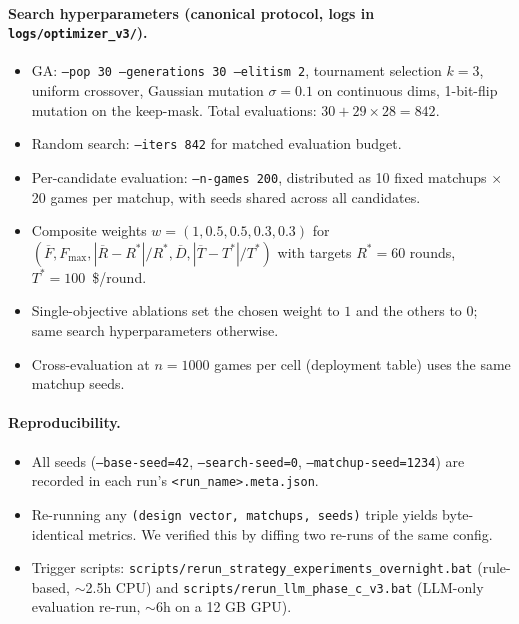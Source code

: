 \documentclass[10pt]{article}
\begin{document}
\paragraph{Search hyperparameters (canonical protocol, logs in
\texttt{logs/optimizer\_v3/}).}
\begin{itemize}[leftmargin=1.2em,itemsep=1pt]
\item GA: \texttt{--pop 30 --generations 30 --elitism 2}, tournament
selection $k{=}3$, uniform crossover, Gaussian mutation
$\sigma{=}0.1$ on continuous dims, 1-bit-flip mutation on the
keep-mask. Total evaluations: $30 + 29 \times 28 = 842$.
\item Random search: \texttt{--iters 842} for matched evaluation
budget.
\item Per-candidate evaluation: \texttt{--n-games 200}, distributed
as 10 fixed matchups $\times$ 20 games per matchup, with seeds
shared across all candidates.
\item Composite weights $w = (1, 0.5, 0.5, 0.3, 0.3)$ for
$(\overline{F}, F_{\max}, |\overline{R}-R^{*}|/R^{*},
\overline{D}, |\overline{T}-T^{*}|/T^{*})$ with targets
$R^{*} = 60$ rounds, $T^{*} = 100$~\$/round.
\item Single-objective ablations set the chosen weight to $1$ and
the others to $0$; same search hyperparameters otherwise.
\item Cross-evaluation at $n{=}1000$ games per cell (deployment
table) uses the same matchup seeds.
\end{itemize}

\paragraph{Reproducibility.}
\begin{itemize}[leftmargin=1.2em,itemsep=1pt]
\item All seeds (\texttt{--base-seed=42}, \texttt{--search-seed=0},
\texttt{--matchup-seed=1234}) are recorded in each run's
\texttt{<run\_name>.meta.json}.
\item Re-running any \texttt{(design vector, matchups, seeds)}
triple yields byte-identical metrics. We verified this by diffing
two re-runs of the same config.
\item Trigger scripts:
\texttt{scripts/rerun\_strategy\_experiments\_overnight.bat}
(rule-based, $\sim$2.5h CPU) and
\texttt{scripts/rerun\_llm\_phase\_c\_v3.bat} (LLM-only evaluation re-run,
$\sim$6h on a 12 GB GPU).
\end{itemize}
\end{document}
